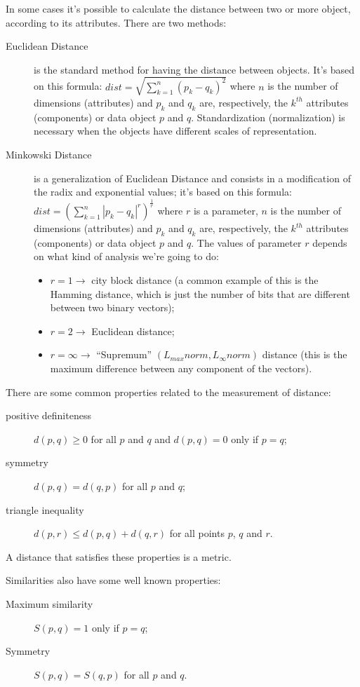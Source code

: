 In some cases it's possible to calculate the distance between two or more object, according to its attributes.
There are two methods:
\begin{description}
	\item[Euclidean Distance] is the standard method for having the distance between objects.
	It's based on this formula: $dist = \sqrt{\sum_{k = 1}^{n} (p_k - q_k)^2}$ where $n$ is the number of dimensions (attributes) and $p_k$ and $q_k$ are, respectively, the $k^{th}$ attributes (components) or data object $p$ and $q$.
	Standardization (normalization) is necessary when the objects have different scales of representation.
	\item[Minkowski Distance] is a generalization of Euclidean Distance and consists in a modification of the radix and exponential values; it's based on this formula: $dist = (\sum_{k = 1}^{n} |p_k - q_k|^r)^{\frac{1}{r}}$ where $r$ is a parameter, $n$ is the number of dimensions (attributes) and $p_k$ and $q_k$ are, respectively, the $k^{th}$ attributes (components) or data object $p$ and $q$.
	The values of parameter $r$ depends on what kind of analysis we're going to do:
	\begin{itemize}
		\item $r = 1 \to $ city block distance (a common example of this is the Hamming distance, which is just the number of bits that are different between two binary vectors);
		\item $r = 2 \to $ Euclidean distance;
		\item $r = \infty \to $ ``Supremum'' $(L_{max}norm, L_{\infty}norm)$ distance (this is the maximum difference between any component of the vectors).
	\end{itemize}
\end{description}

There are some common properties related to the measurement of distance:
\begin{description}
	\item[positive definiteness] $d(p, q) \geq 0$ for all $p$ and $q$ and $d(p, q) = 0$ only if $p = q$;
	\item[symmetry] $d(p, q) = d(q, p)$ for all $p$ and $q$;
	\item[triangle inequality] $d(p, r) \leq d(p, q) + d(q, r)$ for all points $p$, $q$ and $r$.
\end{description}
A distance that satisfies these properties is a metric.

Similarities also have some well known properties:
\begin{description}
	\item[Maximum similarity] $S(p, q) = 1$ only if $p = q$;
	\item[Symmetry] $S(p, q) = S(q, p)$ for all $p$ and $q$.
\end{description}

